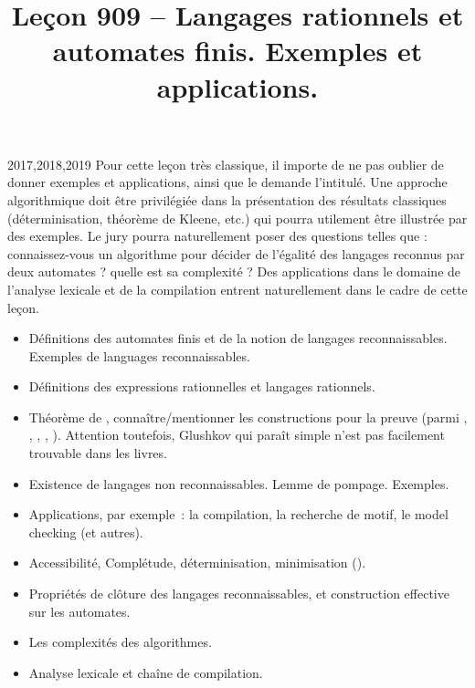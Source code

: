 \documentclass{agregfiche}
\title{Leçon 909 -- Langages rationnels et automates finis.  Exemples et applications.}
\begin{document}
\maketitle

\secrapports

\begin{rapport}{2017,2018,2019}
Pour cette leçon très classique, il importe de ne pas oublier de donner exemples et applications, ainsi
que le demande l’intitulé.
Une approche algorithmique doit être privilégiée dans la présentation des résultats classiques (déterminisation, théorème de
Kleene, etc.) qui pourra utilement être illustrée par des exemples. Le jury pourra naturellement poser des questions telles que : connaissez-vous un algorithme pour décider de l’égalité des langages reconnus par deux automates ? quelle est sa complexité ?
Des applications dans le domaine de l’analyse lexicale et de la compilation entrent naturellement dans
le cadre de cette leçon.
\end{rapport}

\secindispensables

\begin{itemize}
\item  Définitions des automates finis et de la notion de langages reconnaissables. Exemples de languages reconnaissables.
\item Définitions des expressions rationnelles et langages rationnels.
\item Théorème de , connaître/mentionner les constructions pour la preuve (parmi , , , , ). Attention toutefois, Glushkov qui paraît simple n'est pas facilement trouvable dans les livres.
\end{itemize}

\secasavoir

\begin{itemize}
	\item Existence de langages non reconnaissables. Lemme de pompage. Exemples.
	\item Applications, par exemple~: la compilation, la recherche de motif, le
	model checking (et autres).
	\item Accessibilité, Complétude, déterminisation, minimisation ().
	\item Propriétés de clôture des langages reconnaissables, et construction
	effective sur les automates.
	\item Les complexités des algorithmes.
  	\item Analyse lexicale et chaîne de compilation.
\end{itemize}
\end{document}

